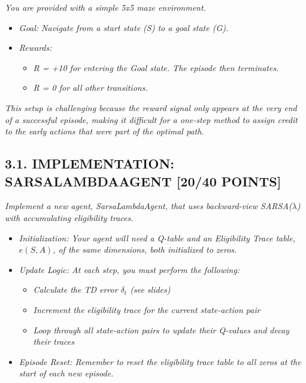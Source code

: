 \documentclass{article}
\begin{document}
\textit{You are provided with a simple 5x5 maze environment.}

\begin{itemize}
    \item \textit{Goal: Navigate from a start state (S) to a goal state (G).}
    \item \textit{Rewards:}
    \begin{itemize}
        \item \textit{R = +10 for entering the Goal state. The episode then terminates.}
        \item \textit{R = 0 for all other transitions.}
    \end{itemize}
\end{itemize}

\textit{This setup is challenging because the reward signal only appears at the very end of a successful episode, making it difficult for a one-step method to assign credit to the early actions that were part of the optimal path.}

\subsection{3.1. IMPLEMENTATION: SARSALAMBDAAGENT [20/40 POINTS]}

\textit{Implement a new agent, SarsaLambdaAgent, that uses backward-view SARSA($\lambda$) with accumulating eligibility traces.}

\begin{itemize}
    \item \textit{Initialization: Your agent will need a Q-table and an Eligibility Trace table, $e(S, A)$, of the same dimensions, both initialized to zeros.}
    \item \textit{Update Logic: At each step, you must perform the following:}
    \begin{itemize}
        \item \textit{Calculate the TD error $\delta_t$ (see slides)}
        \item \textit{Increment the eligibility trace for the current state-action pair}
        \item \textit{Loop through all state-action pairs to update their Q-values and decay their traces}
    \end{itemize}
    \item \textit{Episode Reset: Remember to reset the eligibility trace table to all zeros at the start of each new episode.}
\end{itemize}
\end{document}
